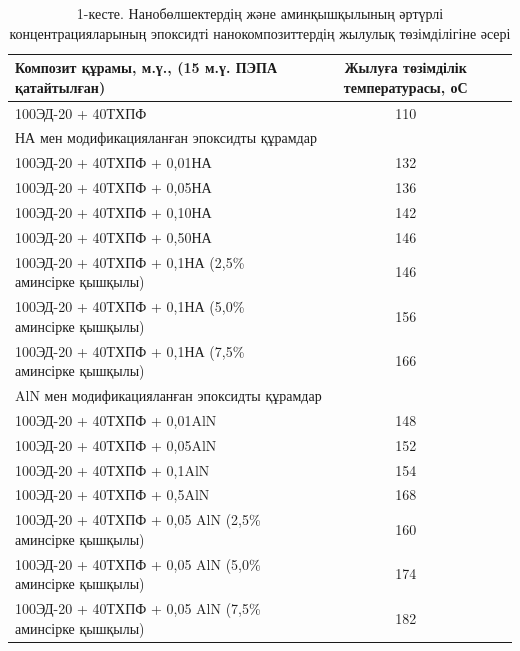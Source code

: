 \begin{table}[H]
\caption*{1-кесте. Нанобөлшектердің және аминқышқылының әртүрлі
концентрацияларының эпоксидті нанокомпозиттердің жылулық төзімділігіне
әсері}
\centering
\begin{tabular}{|lc|}
\hline
\multicolumn{1}{|l|}{\textbf{Композит құрамы, м.ү., (15 м.ү. ПЭПА қатайтылған)}} & \multicolumn{1}{p{0.2\textwidth}|}{Жылуға төзімділік температурасы, оС} \\ \hline
\multicolumn{1}{|l|}{100ЭД-20 + 40ТХПФ}                                      & 110 \\ \hline
\multicolumn{2}{|l|}{НА мен модификацияланған эпоксидты құрамдар}                  \\ \hline
\multicolumn{1}{|l|}{100ЭД-20 + 40ТХПФ + 0,01НА}                             & 132 \\ \hline
\multicolumn{1}{|l|}{100ЭД-20 + 40ТХПФ + 0,05НА}                             & 136 \\ \hline
\multicolumn{1}{|l|}{100ЭД-20 + 40ТХПФ + 0,10НА}                             & 142 \\ \hline
\multicolumn{1}{|l|}{100ЭД-20 + 40ТХПФ + 0,50НА}                             & 146 \\ \hline
\multicolumn{1}{|l|}{100ЭД-20 + 40ТХПФ + 0,1НА (2,5\% аминсірке қышқылы)}    & 146 \\ \hline
\multicolumn{1}{|l|}{100ЭД-20 + 40ТХПФ + 0,1НА (5,0\% аминсірке қышқылы)}    & 156 \\ \hline
\multicolumn{1}{|l|}{100ЭД-20 + 40ТХПФ + 0,1НА (7,5\% аминсірке қышқылы)}    & 166 \\ \hline
\multicolumn{2}{|l|}{AlN мен модификацияланған эпоксидты құрамдар}                 \\ \hline
\multicolumn{1}{|l|}{100ЭД-20 + 40ТХПФ + 0,01AlN}                            & 148 \\ \hline
\multicolumn{1}{|l|}{100ЭД-20 + 40ТХПФ + 0,05AlN}                            & 152 \\ \hline
\multicolumn{1}{|l|}{100ЭД-20 + 40ТХПФ + 0,1AlN}                             & 154 \\ \hline
\multicolumn{1}{|l|}{100ЭД-20 + 40ТХПФ + 0,5AlN}                             & 168 \\ \hline
\multicolumn{1}{|l|}{100ЭД-20 + 40ТХПФ + 0,05 AlN (2,5\% аминсірке қышқылы)} & 160 \\ \hline
\multicolumn{1}{|l|}{100ЭД-20 + 40ТХПФ + 0,05 AlN (5,0\% аминсірке қышқылы)} & 174 \\ \hline
\multicolumn{1}{|l|}{100ЭД-20 + 40ТХПФ + 0,05 AlN (7,5\% аминсірке қышқылы)} & 182 \\ \hline
\end{tabular}
\end{table}

